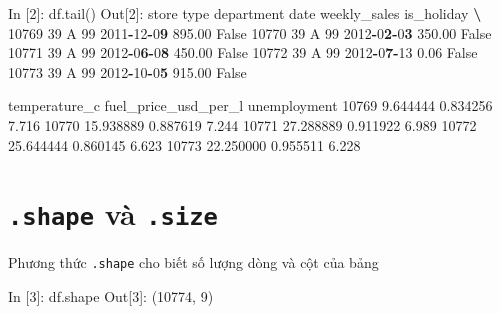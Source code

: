 \documentclass[
]{book}
\newenvironment{Shaded}{\begin{snugshade}}{\end{snugshade}}
\newcommand{\BuiltInTok}[1]{#1}
\newcommand{\DecValTok}[1]{\textcolor[rgb]{0.00,0.00,0.81}{#1}}
\newcommand{\ErrorTok}[1]{\textcolor[rgb]{0.64,0.00,0.00}{\textbf{#1}}}
\newcommand{\FloatTok}[1]{\textcolor[rgb]{0.00,0.00,0.81}{#1}}
\newcommand{\NormalTok}[1]{#1}
\newcommand{\OperatorTok}[1]{\textcolor[rgb]{0.81,0.36,0.00}{\textbf{#1}}}
\newcommand{\VariableTok}[1]{\textcolor[rgb]{0.00,0.00,0.00}{#1}}
\begin{document}
\begin{Shaded}
\begin{Highlighting}[]
\NormalTok{In [}\DecValTok{2}\NormalTok{]: df.tail()}
\NormalTok{Out[}\DecValTok{2}\NormalTok{]:}
\NormalTok{       store }\BuiltInTok{type}\NormalTok{  department        date  weekly\_sales  is\_holiday  }\OperatorTok{\textbackslash{}}
\DecValTok{10769}     \DecValTok{39}\NormalTok{    A          }\DecValTok{99}  \DecValTok{2011}\OperatorTok{{-}}\DecValTok{12}\OperatorTok{{-}}\DecValTok{0}\ErrorTok{9}        \FloatTok{895.00}       \VariableTok{False}   
\DecValTok{10770}     \DecValTok{39}\NormalTok{    A          }\DecValTok{99}  \DecValTok{2012}\OperatorTok{{-}}\DecValTok{0}\ErrorTok{2}\OperatorTok{{-}}\DecValTok{0}\ErrorTok{3}        \FloatTok{350.00}       \VariableTok{False}   
\DecValTok{10771}     \DecValTok{39}\NormalTok{    A          }\DecValTok{99}  \DecValTok{2012}\OperatorTok{{-}}\DecValTok{0}\ErrorTok{6}\OperatorTok{{-}}\DecValTok{0}\ErrorTok{8}        \FloatTok{450.00}       \VariableTok{False}   
\DecValTok{10772}     \DecValTok{39}\NormalTok{    A          }\DecValTok{99}  \DecValTok{2012}\OperatorTok{{-}}\DecValTok{0}\ErrorTok{7}\OperatorTok{{-}}\DecValTok{13}          \FloatTok{0.06}       \VariableTok{False}   
\DecValTok{10773}     \DecValTok{39}\NormalTok{    A          }\DecValTok{99}  \DecValTok{2012}\OperatorTok{{-}}\DecValTok{10}\OperatorTok{{-}}\DecValTok{0}\ErrorTok{5}        \FloatTok{915.00}       \VariableTok{False}   

\NormalTok{       temperature\_c  fuel\_price\_usd\_per\_l  unemployment  }
\DecValTok{10769}       \FloatTok{9.644444}              \FloatTok{0.834256}         \FloatTok{7.716}  
\DecValTok{10770}      \FloatTok{15.938889}              \FloatTok{0.887619}         \FloatTok{7.244}  
\DecValTok{10771}      \FloatTok{27.288889}              \FloatTok{0.911922}         \FloatTok{6.989}  
\DecValTok{10772}      \FloatTok{25.644444}              \FloatTok{0.860145}         \FloatTok{6.623}  
\DecValTok{10773}      \FloatTok{22.250000}              \FloatTok{0.955511}         \FloatTok{6.228} 
\end{Highlighting}
\end{Shaded}

\section{\texorpdfstring{\texttt{.shape} và \texttt{.size}}{.shape và .size}}\label{shape-vuxe0-.size}

Phương thức \texttt{.shape} cho biết số lượng dòng và cột của bảng

\begin{Shaded}
\begin{Highlighting}[]
\NormalTok{In [}\DecValTok{3}\NormalTok{]: df.shape}
\NormalTok{Out[}\DecValTok{3}\NormalTok{]: (}\DecValTok{10774}\NormalTok{, }\DecValTok{9}\NormalTok{)}
\end{Highlighting}
\end{Shaded}
\end{document}
